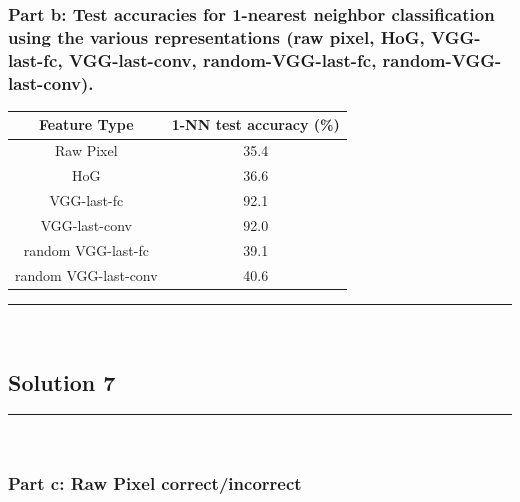 \documentclass{article}
\begin{document}
\subsubsection*{Part b: Test accuracies for 1-nearest neighbor classification using the various representations (raw pixel, HoG, VGG-last-fc, VGG-last-conv, random-VGG-last-fc, random-VGG-last-conv).}
\begin{center} 
  \begin{tabular}{|c|c|} 
    \hline Feature Type & 1-NN test accuracy (\%) \\ 
    \hline 
    Raw Pixel & 35.4 \\ 
    HoG & 36.6  \\
    VGG-last-fc & 92.1 \\
    VGG-last-conv & 92.0 \\
    random VGG-last-fc & 39.1 \\
    random VGG-last-conv & 40.6 \\ 
    \hline
  \end{tabular}
\end{center}
\noindent\rule{\textwidth}{0.4pt}\\

\newpage

\subsection*{Solution 7}
\noindent\rule{\textwidth}{0.4pt}\\
\subsubsection*{Part c:  Raw Pixel correct/incorrect}
\end{document}
